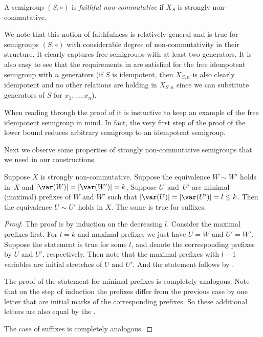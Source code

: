 \begin{definition}
	\label{def:faithful}
	A semigroup $(S, \circ)$ is \emph{faithful non-commutative} if $X_S$ is strongly
	non-commutative.
\end{definition}

We note that this notion of faithfulness is relatively general and is true for
semigroups $(S,\circ)$ with considerable degree of non-commutativity in their
structure. It clearly captures free semigroups with at least two generators. It
is also easy to see that the
requirements in  are satisfied for the free
idempotent semigroup with $n$ generators (if $S$ is idempotent, then $X_{S,n}$
is also clearly idempotent and no other relations are holding in $X_{S,n}$ since
we can substitute generators of $S$ for $x_1, \ldots, x_n$).

When reading through the proof of  it is instuctive to keep an example of the free idempotent semigroup in mind. In fact, the very first step of the proof of the lower bound reduces arbitrary semigroup to an idempotent semigroup.

Next we observe some properties of strongly non-commutative semigroups that we
need in our constructions.

%

\begin{lemma} \label{lem:prefix_equivalence}
Suppose $X$ is strongly non-commutative. Suppose the equivalence $W \sim W'$
holds in~$X$ and $|\var(W)|=|\var(W')|=k$. Suppose $U$~and~$U'$ are minimal
(maximal) prefixes of $W$ and $W'$ such that $|\var(U)| = |\var(U')| = l\leq k$.
Then the equivalence $U \sim U'$ holds in $X$. The same is true for suffixes.
\end{lemma}

\begin{proof}
The proof is by induction on the decreasing $l$. Consider the maximal prefixes
first. For $l=k$ and maximal prefixes we just have $U=W$ and $U'=W'$. Suppose
the statement is true for some $l$, and denote the corresponding prefixes by $U$
and $U'$, respectively. Then note that the maximal prefixes with $l-1$ variables
are
%
%
initial stretches %
of $U$ and $U'$. And the statement follows by
.

The proof of the statement for minimal prefixes is completely analogous. Note
that on the step of induction the prefixes differ from the previous case by one
letter that are initial marks of the corresponding prefixes. So these additional
letters are also equal by the .

The case of suffixes is completely analogous.
\end{proof}

